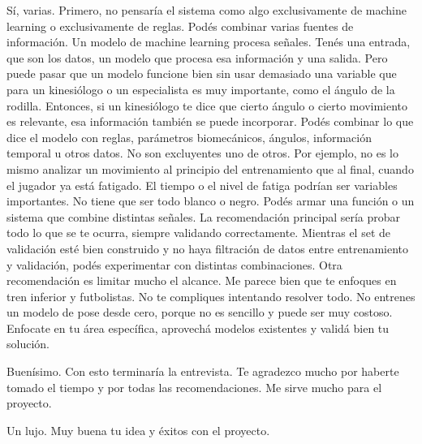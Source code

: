 \begin{description}[leftmargin=0pt, itemindent=\parindent, labelsep=0.5em, itemsep=0pt, parsep=0pt, topsep=0pt]
    \item[\textbf{Gonzalo Pereyra Metnyk:}] Sí, varias. Primero, no pensaría el sistema como algo exclusivamente de machine learning o exclusivamente de reglas. Podés combinar varias fuentes de información. Un modelo de machine learning procesa señales. Tenés una entrada, que son los datos, un modelo que procesa esa información y una salida. Pero puede pasar que un modelo funcione bien sin usar demasiado una variable que para un kinesiólogo o un especialista es muy importante, como el ángulo de la rodilla. Entonces, si un kinesiólogo te dice que cierto ángulo o cierto movimiento es relevante, esa información también se puede incorporar. Podés combinar lo que dice el modelo con reglas, parámetros biomecánicos, ángulos, información temporal u otros datos. No son excluyentes uno de otros. Por ejemplo, no es lo mismo analizar un movimiento al principio del entrenamiento que al final, cuando el jugador ya está fatigado. El tiempo o el nivel de fatiga podrían ser variables importantes. No tiene que ser todo blanco o negro. Podés armar una función o un sistema que combine distintas señales. La recomendación principal sería probar todo lo que se te ocurra, siempre validando correctamente. Mientras el set de validación esté bien construido y no haya filtración de datos entre entrenamiento y validación, podés experimentar con distintas combinaciones. Otra recomendación es limitar mucho el alcance. Me parece bien que te enfoques en tren inferior y futbolistas. No te compliques intentando resolver todo. No entrenes un modelo de pose desde cero, porque no es sencillo y puede ser muy costoso. Enfocate en tu área específica, aprovechá modelos existentes y validá bien tu solución.

    \item[\textbf{Entrevistador:}] Buenísimo. Con esto terminaría la entrevista. Te agradezco mucho por haberte tomado el tiempo y por todas las recomendaciones. Me sirve mucho para el proyecto.

    \item[\textbf{Gonzalo Pereyra Metnyk:}] Un lujo. Muy buena tu idea y éxitos con el proyecto.
\end{description}